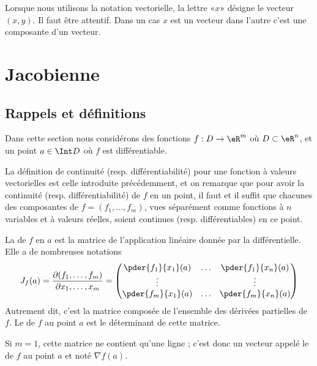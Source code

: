 \begin{remark}
	Lorsque nous utilisons la notation vectorielle, la lettre «\( x\)» désigne le vecteur \( (x,y)\). Il faut être attentif. Dans un cas \( x\) est un vecteur dans l'autre c'est une composante d'un vecteur.
\end{remark}

\section{Jacobienne}

\subsection{Rappels et définitions}

Dans cette section nous considérons des fonctions \( f : D \to \eR^m\)
où \( D \subset \eR^n\), et un point \( a \in \Int D\) où \( f\) est
différentiable.
\begin{remark}
	La définition de continuité (resp. différentiabilité) pour une
	fonction à valeurs vectorielles est celle introduite précédemment,
	et on remarque que pour avoir la continuité
	(resp. différentiabilité) de \( f\) en un point, il faut et il suffit
	que chacunes des composantes de \( f = (f_1,\ldots, f_m)\), vues
	séparément comme fonctions à \( n\) variables et à valeurs réelles,
	soient continues (resp. différentiables) en ce point.
\end{remark}

\begin{definition}
	La  de \( f\) en \( a\) est la matrice de l'application linéaire donnée par la différentielle. Elle a de nombreuses notations
	\begin{equation}
		J_f(a) = \frac{ \partial (f_1,\ldots, f_m) }{ \partial x_1,\ldots, x_m }=
		\begin{pmatrix}
			\pder {f_1} {x_1}(a) & \ldots & \pder {f_1} {x_n}(a) \\
			\vdots               &        & \vdots               \\
			\pder {f_m} {x_1}(a) & \ldots & \pder {f_m} {x_n}(a)
		\end{pmatrix}
	\end{equation}
	Autrement dit, c'est la matrice composée de l'ensemble des dérivées partielles de \( f\). Le  de \( f\) au point \( a\) est le déterminant de cette matrice.

	Si \( m = 1\), cette matrice ne contient qu'une ligne ; c'est donc un vecteur appelé le  de \( f\) au point \( a\) et noté \( \nabla f(a)\).
\end{definition}

